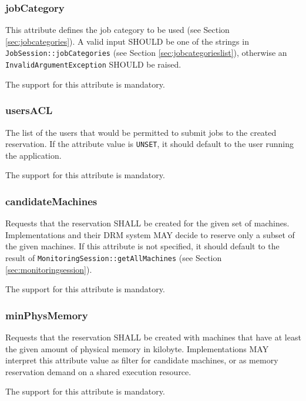 \documentclass{article}
\newcommand{\h}[1]{\lstinline|#1|}
\newcommand{\rat}[1]{}
\begin{document}
\subsubsection{jobCategory}

This attribute defines the job category to be used (see Section \ref{sec:jobcategories}). A valid input SHOULD be one of the strings in \h{JobSession::jobCategories} (see Section \ref{sec:jobcategorieslist}), otherwise an \h{InvalidArgumentException} SHOULD be raised.

The support for this attribute is mandatory.

\subsubsection{usersACL}

The list of the users that would be permitted to submit jobs to the created reservation. If the attribute value is \h{UNSET}, it should default to the user running the application.

The support for this attribute is mandatory.

\subsubsection{candidateMachines}

Requests that the reservation SHALL be created for the given set of machines. Implementations and their DRM system MAY decide to reserve only a subset of the given machines. If this attribute is not specified, it should default to the result of \h{MonitoringSession::getAllMachines} (see Section \ref{sec:monitoringsession}).

The support for this attribute is mandatory.

\rat{May 18th 2011 conf call identified the subset reservation feature to be only available in some of the systems, so it is no promise here.}

\subsubsection{minPhysMemory}

Requests that the reservation SHALL be created with machines that have at least the given amount of physical memory in kilobyte. Implementations MAY interpret this attribute value as filter for candidate machines, or as memory reservation demand on a shared execution resource.

The support for this attribute is mandatory. 
\end{document}
